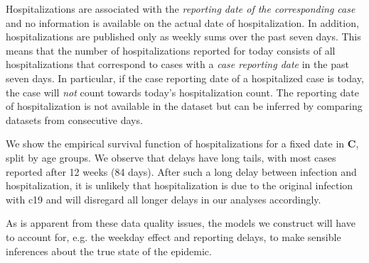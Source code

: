 Hospitalizations are associated with the \emph{reporting date of the corresponding case} and no information is available on the actual date of hospitalization. In addition, hospitalizations are published only as weekly sums over the past seven days. This means that the number of hospitalizations reported for today consists of all hospitalizations that correspond to cases with a \emph{case reporting date} in the past seven days. In particular, if the case reporting date of a hospitalized case is today, the case will \emph{not} count towards today's hospitalization count. The reporting date of hospitalization is not available in the dataset but can be inferred by comparing datasets from consecutive days.

We show the empirical survival function of hospitalizations for a fixed date in  \textbf{C}, split by age groups. We observe that delays have long tails, with most cases reported after 12 weeks (84 days). After such a long delay between infection and hospitalization, it is unlikely that hospitalization is due to the original infection with \acrshort{c19} and will disregard all longer delays in our analyses accordingly. 

As is apparent from these data quality issues, the models we construct will have to account for, e.g. the weekday effect and reporting delays, to make sensible inferences about the true state of the epidemic. 